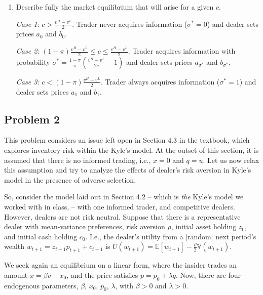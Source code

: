 \documentclass[11pt
]{exam}
\begin{document}
\begin{enumerate} [label=(\alph*). ]
\begin{solution}
\end{solution}


\item Describe fully the market equilibrium that will arise for a given $c$. 

\begin{solution}
  \textit{Case 1:} $c > \frac{v^H-v^L}{2}$. Trader never acquires information ($\sigma^*=0$) and dealer sets prices $a_0$ and $b_0$. 
  
  \textit{Case 2:} $(1-\pi) \frac{v^H-v^L}{2} \le c \le \frac{v^H-v^L}{2}$. Trader acquires information with probability $\sigma^*=\frac{1-\pi}{\pi} \left(\frac{v^H-v^L}{2c} -1 \right)$ and dealer sets prices $a_{\sigma^*}$ and $b_{\sigma^*}$. 
  
  \textit{Case 3:} $c<(1-\pi) \frac{v^H-v^L}{2}$. Trader always acquires information ($\sigma^*=1$) and dealer sets prices $a_1$ and $b_1$.
\end{solution}

\end{enumerate}



\qquad
\subsection*{Problem 2}


This problem considers an issue left open in Section 4.3 in the textbook, which explores inventory risk within the Kyle's model. At the outset of this section, it is assumed that there is no informed trading, i.e., $x = 0$ and $q = u$. Let us now relax this assumption and try to analyze the effects of dealer's risk aversion in Kyle's model in the presence of adverse selection.

So, consider the model laid out in Section 4.2 -- which is \emph{the} Kyle's model we worked with in class, -- with one informed trader, and competitive dealers. However, dealers are not risk neutral. Suppose that there is a representative dealer with mean-variance preferences, risk aversion $\rho$, initial asset holding $z_{0}$, and initial cash holding $c_{0}$. I.e., the dealer's utility from a [random] next period's wealth $w_{t+1} = z_{t+1}p_{t+1} + c_{t+1}$ is $U(w_{t+1}) = \mathbb{E}[w_{t+1}] - \frac{\rho}{2} \mathbb{V}(w_{t+1})$.

We seek again an equilibrium on a linear form, where the insider trades an amount $x =	\beta v - x_{0}$, and the price satisfies $p = p_{0}+\lambda q$. Now, there are four endogenous parameters, $\beta$, $x_{0}$, $p_{0}$, $\lambda$, with $\beta>0$ and $\lambda>0$.
\end{document}
